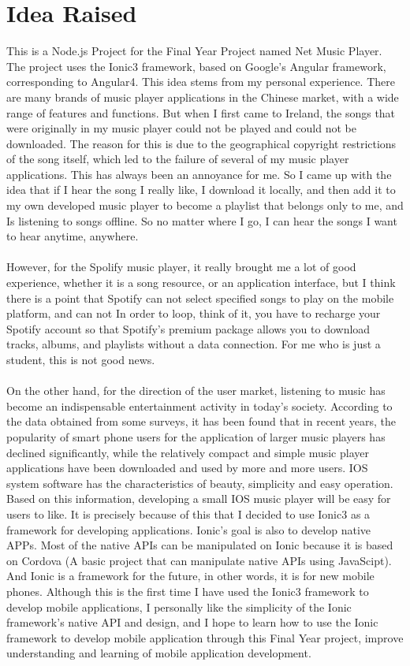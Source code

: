 \section{Idea Raised} 
This is a Node.js Project for the Final Year Project named Net Music Player. The project uses the Ionic3 framework, based on Google's Angular framework, corresponding to Angular4. This idea stems from my personal experience. There are many brands of music player applications in the Chinese market, with a wide range of features and functions. But when I first came to Ireland, the songs that were originally in my music player could not be played and could not be downloaded. The reason for this is due to the geographical copyright restrictions of the song itself, which led to the failure of several of my music player applications. This has always been an annoyance for me. So I came up with the idea that if I hear the song I really like, I download it locally, and then add it to my own developed music player to become a playlist that belongs only to me, and Is listening to songs offline. So no matter where I go, I can hear the songs I want to hear anytime, anywhere. \\ \\ However, for the Spolify music player, it really brought me a lot of good experience, whether it is a song resource, or an application interface, but I think there is a point that Spotify can not select specified songs to play on the mobile platform, and can not In order to loop, think of it, you have to recharge your Spotify account so that Spotify's premium package allows you to download tracks, albums, and playlists without a data connection\cite{1}. For me who is just a student, this is not good news. \\ \\ On the other hand, for the direction of the user market, listening to music has become an indispensable entertainment activity in today's society. According to the data obtained from some surveys, it has been found that in recent years, the popularity of smart phone users for the application of larger music players has declined significantly, while the relatively compact and simple music player applications have been downloaded and used by more and more users. IOS system software has the characteristics of beauty, simplicity and easy operation. Based on this information, developing a small IOS music player will be easy for users to like.  It is precisely because of this that I decided to use Ionic3 as a framework for developing applications. Ionic's goal is also to develop native APPs. Most of the native APIs can be manipulated on Ionic because it is based on Cordova (A basic project that can manipulate native APIs using JavaScipt). And Ionic is a framework for the future, in other words, it is for new mobile phones. Although this is the first time I have used the Ionic3 framework to develop mobile applications, I personally like the simplicity of the Ionic framework's native API and design, and I hope to learn how to use the Ionic framework to develop mobile application through this Final Year project, improve understanding and learning of mobile application development.

